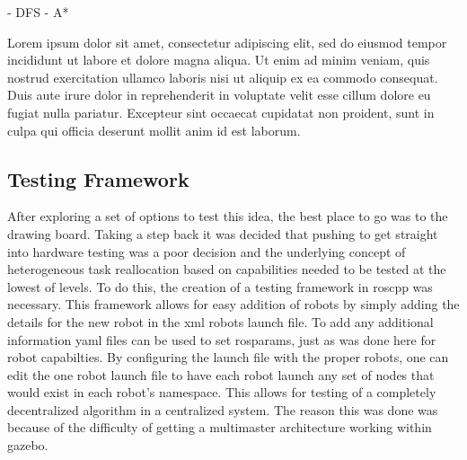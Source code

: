 - DFS
- A*

Lorem ipsum dolor sit amet, consectetur adipiscing elit,
sed do eiusmod tempor incididunt ut labore et dolore magna aliqua. Ut enim ad
minim veniam, quis nostrud exercitation ullamco laboris nisi ut aliquip ex ea
commodo consequat. Duis aute irure dolor in reprehenderit in voluptate velit
esse cillum dolore eu fugiat nulla pariatur. Excepteur sint occaecat cupidatat
non proident, sunt in culpa qui officia deserunt mollit anim id est laborum.


\subsection{Testing Framework}

After exploring a set of options to test this idea, the best place to go was to the drawing
board. Taking a step back it was decided that pushing to get straight into hardware testing
was a poor decision and the underlying concept of heterogeneous task reallocation based on
capabilities needed to be tested at the lowest of levels. To do this, the creation of a testing
framework in roscpp was necessary. This framework allows for easy addition of robots by simply
adding the details for the new robot in the xml robots launch file. To add any additional information
yaml files can be used to set rosparams, just as was done here for robot capabilties. By configuring
the launch file with the proper robots, one can edit the one robot launch file to have each robot launch
any set of nodes that would exist in each robot's namespace. This allows for testing of a completely
decentralized algorithm in a centralized system. The reason this was done was because of the difficulty
of getting a multimaster architecture working within gazebo.
